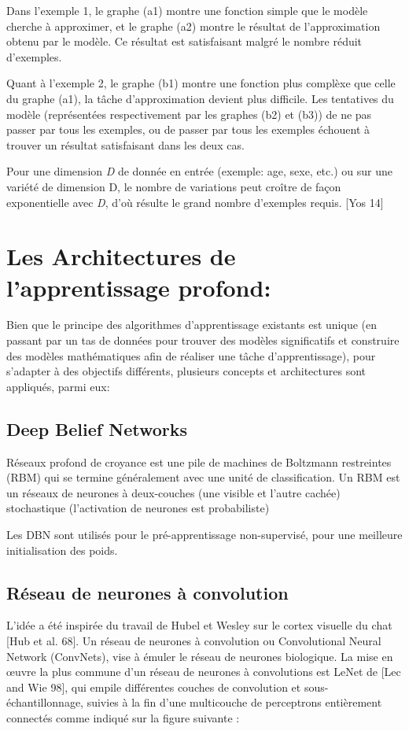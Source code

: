 Dans l'exemple 1, le graphe (a1) montre une fonction simple que le modèle cherche à approximer, et le graphe (a2) montre le résultat de l'approximation obtenu par le modèle. Ce résultat est satisfaisant malgré le nombre  réduit d'exemples.

Quant à l'exemple 2, le graphe (b1) montre une fonction plus complèxe que celle du graphe (a1), la tâche d'approximation devient plus difficile. Les tentatives du modèle  (représentées respectivement par les graphes (b2) et (b3)) de ne pas passer par tous les exemples, ou de passer par tous les exemples échouent à trouver un résultat satisfaisant dans les deux cas. 

Pour une dimension \textit{D} de donnée en entrée (exemple: age, sexe, etc.) ou sur une variété de dimension D, le nombre de variations peut croître de façon exponentielle avec \textit{D}, d'où résulte le grand nombre d'exemples requis. [Yos 14]

\section{Les Architectures de l'apprentissage profond:}

Bien que le principe des algorithmes d'apprentissage existants est unique (en passant par un tas de données pour trouver des modèles significatifs et construire des modèles mathématiques afin de réaliser une tâche d'apprentissage), pour s'adapter à des objectifs différents, plusieurs concepts et architectures sont appliqués, parmi eux:
 

\subsection{Deep Belief Networks}

Réseaux profond de croyance est une pile de machines de Boltzmann restreintes (RBM) qui se termine généralement avec une unité de classification. Un RBM est un réseaux de neurones à deux-couches (une visible et l'autre cachée) stochastique (l'activation de neurones est probabiliste)

Les DBN sont utilisés pour le pré-apprentissage non-supervisé, pour une meilleure initialisation des poids.



\subsection{Réseau de neurones à convolution}
L'idée a été inspirée du travail de Hubel et Wesley sur le cortex visuelle du chat [Hub et al. 68]. Un réseau de neurones à convolution ou Convolutional Neural Network (ConvNets), vise à émuler le réseau de neurones biologique.
	La mise en œuvre la plus commune d'un réseau de neurones à convolutions est LeNet de [Lec and Wie 98], qui empile différentes couches de convolution et sous-échantillonnage, suivies à la fin d'une multicouche de perceptrons entièrement connectés comme indiqué sur la figure suivante :

